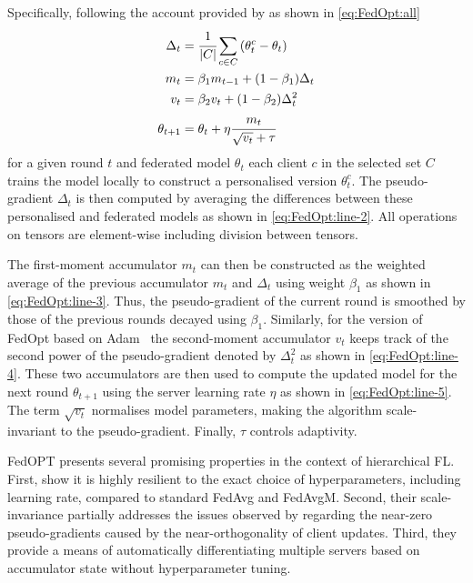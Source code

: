 Specifically, following the account provided by \citet{FedOPT} as shown in \cref{eq:FedOpt:all}
\begin{subequations}
    \begin{align}
        \Delta_t     & = \cfrac{1}{|C|} \sum_{c \in C} \left( \theta_t^c - \theta_t \right) \label{eq:FedOpt:line-2} \\
        m_t          & = \beta_1 m_{t-1} + (1-\beta_1) \Delta_t \label{eq:FedOpt:line-3}                             \\
        v_t          & = \beta_2 v_t + (1-\beta_2) \Delta_t^2 \label{eq:FedOpt:line-4}     \                         \\
        \theta_{t+1} & = \theta_t + \eta \cfrac{m_t}{\sqrt{v_t} + \tau} \label{eq:FedOpt:line-5}
    \end{align}
    \label{eq:FedOpt:all}
\end{subequations}
for a given round $t$ and federated model $\theta_t$  each client $c$ in the selected set $C$ trains the model locally to construct a personalised version $\theta_t^c$. The pseudo-gradient $\Delta_t$ is then computed by averaging the differences between these personalised and federated models as shown in \cref{eq:FedOpt:line-2}. All operations on tensors are element-wise including division between tensors.

The first-moment accumulator $m_t$ can then be constructed as the weighted average of the previous accumulator $m_t$ and $\Delta_t$ using weight $\beta_1$ as shown in \cref{eq:FedOpt:line-3}. Thus, the pseudo-gradient of the current round is smoothed by those of the previous rounds decayed using $\beta_1$. Similarly, for the version of FedOpt based on Adam~\citep{Adam} the second-moment accumulator $v_t$  keeps track of the second power of the pseudo-gradient denoted by $\Delta_t^2$ as shown in \cref{eq:FedOpt:line-4}. These two accumulators are then used to compute the updated model for the next round $\theta_{t+1}$ using the server learning rate $\eta$ as shown in \cref{eq:FedOpt:line-5}. The term $\sqrt{v_t}$ normalises model parameters, making the algorithm scale-invariant to the pseudo-gradient. Finally, $\tau$ controls adaptivity\@.

FedOPT presents several promising properties in the context of hierarchical FL\@. First, \citet{FedOPT} show it is highly resilient to the exact choice of hyperparameters, including learning rate, compared to standard FedAvg and FedAvgM. Second, their scale-invariance partially addresses the issues observed by \citet{LargeCohorts} regarding the near-zero pseudo-gradients caused by the near-orthogonality of client updates. Third, they provide a means of automatically differentiating multiple servers based on accumulator state without hyperparameter tuning.

